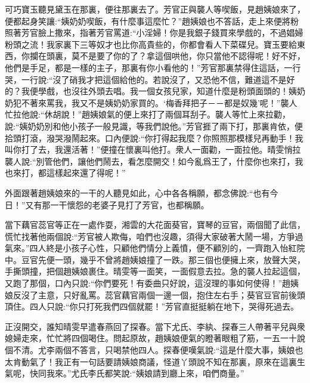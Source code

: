 \begin{parag}
    可巧寶玉聽見黛玉在那裏，便往那裏去了。芳官正與襲人等喫飯，見趙姨娘來了，便都起身笑讓:“姨奶奶喫飯，有什麼事這麼忙？”趙姨娘也不答話，走上來便將粉照著芳官臉上撒來，指著芳官罵道:“小淫婦！你是我銀子錢買來學戲的，不過娼婦粉頭之流！我家裏下三等奴才也比你高貴些的，你都會看人下菜碟兒。寶玉要給東西，你攔在頭裏，莫不是要了你的了？拿這個哄他，你只當他不認得呢！好不好，他們是手足，都是一樣的主子，那裏有你小看他的！”芳官那裏禁得住這話，一行哭，一行說:“沒了硝我才把這個給他的。若說沒了，又恐他不信，難道這不是好的？我便學戲，也沒往外頭去唱。我一個女孩兒家，知道什麼是粉頭面頭的！姨奶奶犯不著來罵我，我又不是姨奶奶家買的。‘梅香拜把子－－都是奴幾’呢！”襲人忙拉他說:“休胡說！”趙姨娘氣的便上來打了兩個耳刮子。襲人等忙上來拉勸，說:“姨奶奶別和他小孩子一般見識，等我們說他。”芳官捱了兩下打，那裏肯依，便拾頭打滾，潑哭潑鬧起來。口內便說:“你打得起我麼？你照照那模樣兒再動手！我叫你打了去，我還活著！”便撞在懷裏叫他打。衆人一面勸，一面拉他。晴雯悄拉襲人說:“別管他們，讓他們鬧去，看怎麼開交！如今亂爲王了，什麼你也來打，我也來打，都這樣起來還了得呢！”
\end{parag}


\begin{parag}
    外面跟著趙姨娘來的一干的人聽見如此，心中各各稱願，都念佛說:“也有今日！”又有那一干懷怨的老婆子見打了芳官，也都稱願。
\end{parag}


\begin{parag}
    當下藕官蕊官等正在一處作耍，湘雲的大花面葵官，寶琴的豆官，兩個聞了此信，慌忙找著他兩個說:“芳官被人欺侮，咱們也沒趣，須得大家破著大鬧一場，方爭過氣來。”四人終是小孩子心性，只顧他們情分上義憤，便不顧別的，一齊跑入怡紅院中。豆官先便一頭，幾乎不曾將趙姨娘撞了一跌。那三個也便擁上來，放聲大哭，手撕頭撞，把個趙姨娘裹住。晴雯等一面笑，一面假意去拉。急的襲人拉起這個，又跑了那個，口內只說:“你們要死！有委曲只好說，這沒理的事如何使得！”趙姨娘反沒了主意，只好亂罵。蕊官藕官兩個一邊一個，抱住左右手；葵官豆官前後頭頂住。四人只說:“你只打死我們四個就罷！”芳官直挺挺躺在地下，哭得死過去。
\end{parag}


\begin{parag}
    正沒開交，誰知晴雯早遣春燕回了探春。當下尤氏、李紈、探春三人帶著平兒與衆媳婦走來，忙忙將四個喝住。問起原故，趙姨娘便氣的瞪著眼粗了筋，一五一十說個不清。尤李兩個不答言，只喝禁他四人。探春便嘆氣說:“這是什麼大事，姨娘也太肯動氣了！我正有一句話要請姨娘商議，怪道丫頭說不知在那裏，原來在這裏生氣呢，快同我來。”尤氏李氏都笑說:“姨娘請到廳上來，咱們商量。”
\end{parag}


